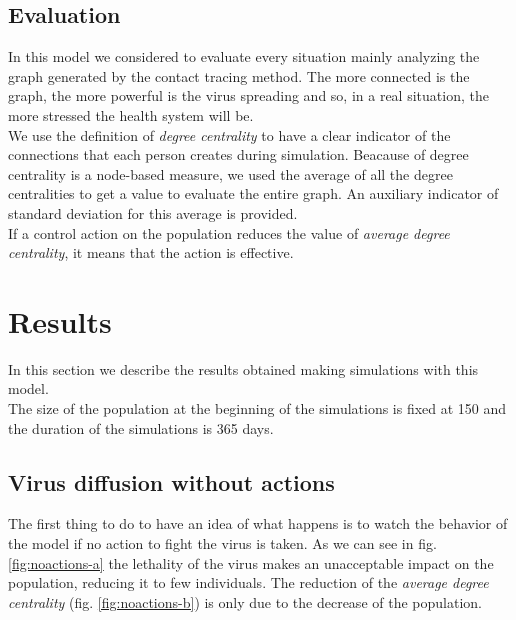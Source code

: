 \documentclass[12pt]{llncs}
\begin{document}
\subsection{Evaluation}
In this model we considered to evaluate every situation mainly analyzing the graph generated by the contact tracing method. The more connected is the graph, the more powerful is the virus spreading and so, in a real situation, the more stressed the health system will be.\\
We use the definition of \textit{degree centrality} to have a clear indicator of the connections that each person creates during simulation. Beacause of degree centrality is a node-based measure, we used the average of all the degree centralities to get a value to evaluate the entire graph. An auxiliary indicator of standard deviation for this average is provided. \\
If a control action on the population reduces the value of \textit{average degree centrality}, it means that the action is effective.

\section{Results}\label{results}
In this section we describe the results obtained making simulations with this model.\\
The size of the population at the beginning of the simulations is fixed at 150 and the duration of the simulations is 365 days.

\subsection{Virus diffusion without actions}
The first thing to do to have an idea of what happens is to watch the behavior of the model if no action to fight the virus is taken. As we can see in fig. \ref{fig:noactions-a} the lethality of the virus makes an unacceptable impact on the population, reducing it to few individuals. The reduction of the \textit{average degree centrality} (fig. \ref{fig:noactions-b}) is only due to the decrease of the population.
\end{document}

